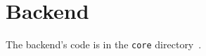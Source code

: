 \section{Backend}\label{sec:backend}

The backend's code is in the \texttt{core} directory~\cite{sewera_notipie_2022}.




